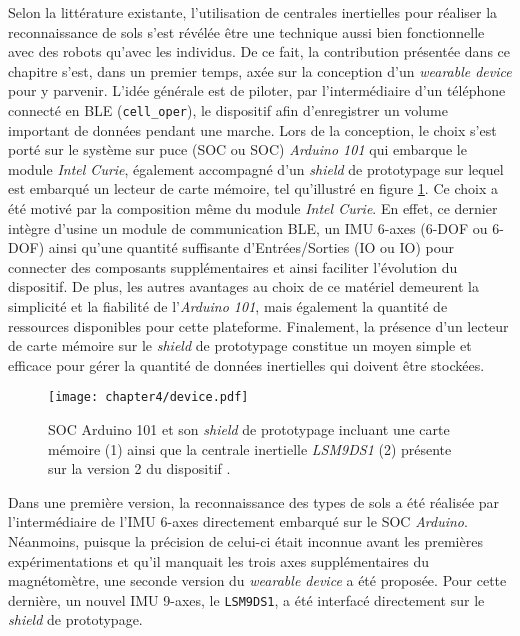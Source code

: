 Selon la littérature existante, l'utilisation de centrales inertielles pour réaliser la reconnaissance de sols s'est révélée être une technique aussi bien fonctionnelle avec des robots qu'avec les individus. De ce fait, la contribution présentée dans ce chapitre s'est, dans un premier temps, axée sur la conception d'un \textit{wearable device} pour y parvenir. L'idée générale est de piloter, par l'intermédiaire d'un téléphone connecté en \acs{BLE} (\texttt{cell\_oper}), le dispositif afin d'enregistrer un volume important de données pendant une marche. Lors de la conception, le choix s'est porté sur le système sur puce (\acl{SOC} ou \acs{SOC}) \textit{Arduino 101} qui embarque le module \textit{Intel Curie}, également accompagné d'un \textit{shield} de prototypage sur lequel est embarqué un lecteur de carte mémoire, tel qu'illustré en figure \ref{fig:device}. Ce choix a été motivé par la composition même du module \textit{Intel Curie}. En effet, ce dernier intègre d'usine un module de communication \acs{BLE}, un \acs{IMU} 6-axes (6-\acl{DOF} ou 6-\acs{DOF}) ainsi qu'une quantité suffisante d'Entrées/Sorties (\acl{IO} ou \acs{IO}) pour connecter des composants supplémentaires et ainsi faciliter l'évolution du dispositif. De plus, les autres avantages au choix de ce matériel demeurent la simplicité et la fiabilité de l'\textit{Arduino 101}, mais également la quantité de ressources disponibles pour cette plateforme. Finalement, la présence d'un lecteur de carte mémoire sur le \textit{shield} de prototypage constitue un moyen simple et efficace pour gérer la quantité de données inertielles qui doivent être stockées.

\begin{figure}[H]
	\centering
	\texttt{[image: chapter4/device.pdf]}
        \caption[\acs{SOC} Arduino 101 et son \textit{shield} de prototypage incluant une carte mémoire (1) ainsi que la centrale inertielle \textit{LSM9DS1} (2) présente sur la version 2 du dispositif.]{\acs{SOC} Arduino 101 et son \textit{shield} de prototypage incluant une carte mémoire (1) ainsi que la centrale inertielle \textit{LSM9DS1} (2) présente sur la version 2 du dispositif \citep{Thullier2017}.}
	\label{fig:device}
\end{figure}

Dans une première version, la reconnaissance des types de sols a été réalisée par l'intermédiaire de l'IMU 6-axes directement embarqué sur le \acs{SOC} \textit{Arduino}. Néanmoins, puisque la précision de celui-ci était inconnue avant les premières expérimentations et qu'il manquait les trois axes supplémentaires du magnétomètre, une seconde version du \textit{wearable device} a été proposée. Pour cette dernière, un nouvel IMU 9-axes, le \texttt{LSM9DS1}, a été interfacé directement sur le \textit{shield} de prototypage.

